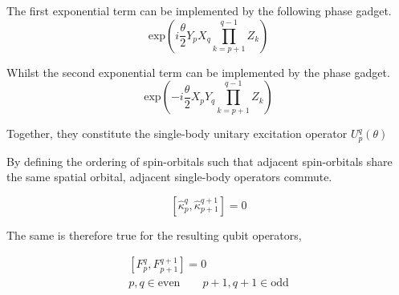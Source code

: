 The first exponential term can be implemented by the following phase gadget.
\begin{equation*}
    \text{exp} \left( i
    \frac{\theta}{2} Y_p X_q \prod_{k=p+1}^{q-1} Z_k \right)
\end{equation*}





Whilst the second exponential term can be implemented by the phase gadget.
\begin{equation*}
    \text{exp} \left( - i
    \frac{\theta}{2} X_p Y_q \prod_{k=p+1}^{q-1} Z_k \right)
\end{equation*}



Together, they constitute the single-body unitary excitation operator $U^q_p (\theta)$


By defining the ordering of spin-orbitals such that adjacent spin-orbitals share the same spatial orbital, adjacent single-body operators commute.

\begin{equation*}
    \left[ \hat\kappa_p^q, \hat\kappa_{p+1}^{q+1} \right] = 0
\end{equation*}\smallskip

The same is therefore true for the resulting qubit operators,

\begin{equation*}
\begin{gathered}
    \left[ F_p^q, F_{p+1}^{q+1} \right] = 0 \\
    p, q \in \text{even} \qquad p+1, q+1 \in \text{odd}
\end{gathered}
\end{equation*}

